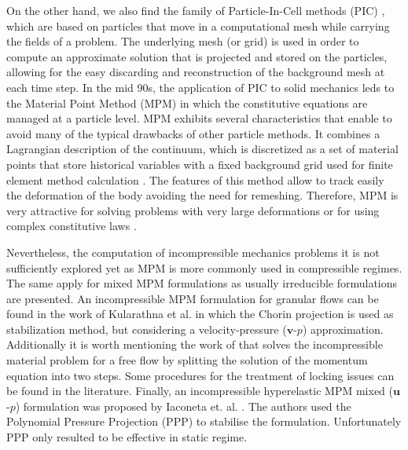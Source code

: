 \documentclass[11pt,english]{article}
\begin{document}
On the other hand, we also find the family of Particle-In-Cell methods (PIC) \cite{harlow1964particle}, which are based on particles that move in a computational mesh while carrying the fields of a problem. The underlying mesh (or grid) is used in order to compute an approximate solution that is projected and stored on the particles, allowing for the easy discarding and reconstruction of the background mesh at each time step. 
In the mid 90s, the application of PIC to solid mechanics leds to the Material Point Method (MPM) \cite{sulsky1995application} in which the constitutive equations are managed at a  particle level. MPM exhibits several characteristics that enable to avoid many of the typical drawbacks of other particle methods. It combines a Lagrangian description of the continuum, which is discretized as a set of material points that store  historical variables  with a fixed background grid used for finite element method calculation \cite{zhang2016material}. The features of this method allow to track easily the deformation of the body avoiding the need for remeshing. Therefore, MPM is very attractive for solving problems with very large deformations \cite{wikeckowski2004material} or for using complex constitutive laws \cite{fern2016role, fern2019material}.

Nevertheless, the computation of incompressible mechanics problems it is not sufficiently explored yet as MPM is more commonly used in compressible regimes. The same apply for mixed MPM formulations as usually irreducible formulations are presented.  
An incompressible MPM formulation for granular flows can be found in the work of Kularathna et al. \cite{kularathna2017implicit} in which the Chorin projection \cite{chorin1968numerical} is used as stabilization method, but considering a velocity-pressure ($\boldsymbol{v}$-$p$) approximation. Additionally it is worth mentioning the work of \cite{zhang2017incompressible} that solves the incompressible material problem for a free flow by splitting the solution of the momentum equation into two steps. 
Some procedures for the treatment of locking issues can be found in the literature. 
Finally, an incompressible hyperelastic MPM mixed ($\boldsymbol{u}$-$p$) formulation was proposed by Iaconeta et. al. \cite{iaconeta2019stabilized}. The authors used the Polynomial Pressure Projection (PPP) \cite{dohrmann2004stabilized} to stabilise the formulation. Unfortunately PPP only resulted to be effective in static regime.
\end{document}
